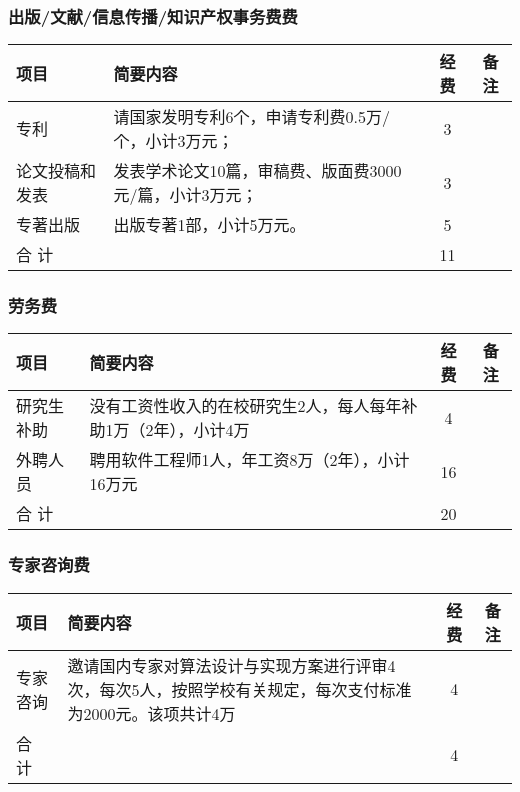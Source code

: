 \subsubsection{出版/文献/信息传播/知识产权事务费费}
\begin{table}[H]
	\centering
	\begin{tabular}{m{3cm} m{7.5cm} cc}
		\toprule
		项目           & 简要内容                                               & 经费 & 备注 \\
		\midrule
		专利           & 请国家发明专利6个，申请专利费0.5万/个，小计3万元；     & 3    &      \\
		论文投稿和发表 & 发表学术论文10篇，审稿费、版面费3000元/篇，小计3万元； & 3    &      \\
		专著出版       & 出版专著1部，小计5万元。                               & 5    &      \\
		合 计          &                                                        & 11          \\
		\bottomrule
	\end{tabular}
\end{table}

\subsubsection{劳务费}
\begin{table}[H]
	\centering
	\begin{tabular}{m{3cm} m{7.5cm} cc}
		\toprule
		项目       & 简要内容                                                       & 经费 & 备注 \\
		\midrule
		研究生补助 & 没有工资性收入的在校研究生2人，每人每年补助1万（2年），小计4万 & 4    &      \\
		外聘人员   & 聘用软件工程师1人，年工资8万（2年），小计16万元                & 16   &      \\
		合 计      &                                                                & 20          \\
		\bottomrule
	\end{tabular}
\end{table}

\subsubsection{专家咨询费}
\begin{table}[H]
	\centering
	\begin{tabular}{m{3cm} m{7.5cm} cc}
		\toprule
		项目     & 简要内容                                                                                                  & 经费 & 备注 \\
		\midrule
		专家咨询 & 邀请国内专家对算法设计与实现方案进行评审4次，每次5人，按照学校有关规定，每次支付标准为2000元。该项共计4万 & 4    &      \\
		合 计    &                                                                                                           & 4           \\
		\bottomrule
	\end{tabular}
\end{table}

